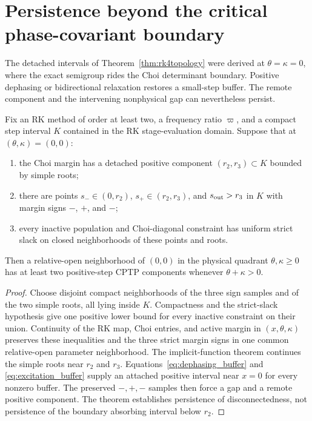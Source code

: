 \section{Persistence beyond the critical phase-covariant boundary}
\label{sec:robustness}

The detached intervals of Theorem~\ref{thm:rk4topology} were derived at $\theta=\kappa=0$, where the exact semigroup rides the Choi determinant boundary. Positive dephasing or bidirectional relaxation restores a small-step buffer. The remote component and the intervening nonphysical gap can nevertheless persist.

\begin{theorem}
\label{thm:persistence}
Fix an RK method of order at least two, a frequency ratio $\varpi$, and a compact step interval $K$ contained in the RK stage-evaluation domain. Suppose that at $(\theta,\kappa)=(0,0)$:
\begin{enumerate}
 \item the Choi margin has a detached positive component $(r_2,r_3)\subset K$ bounded by simple roots;
 \item there are points $s_-\in(0,r_2)$, $s_+\in(r_2,r_3)$, and $s_{\rm out}>r_3$ in $K$ with margin signs $-$, $+$, and $-$;
 \item every inactive population and Choi-diagonal constraint has uniform strict slack on closed neighborhoods of these points and roots.
\end{enumerate}
Then a relative-open neighborhood of $(0,0)$ in the physical quadrant $\theta,\kappa\ge0$ has at least two positive-step CPTP components whenever $\theta+\kappa>0$.
\end{theorem}

\begin{proof}
Choose disjoint compact neighborhoods of the three sign samples and of the two simple roots, all lying inside $K$. Compactness and the strict-slack hypothesis give one positive lower bound for every inactive constraint on their union. Continuity of the RK map, Choi entries, and active margin in $(x,\theta,\kappa)$ preserves these inequalities and the three strict margin signs in one common relative-open parameter neighborhood. The implicit-function theorem continues the simple roots near $r_2$ and $r_3$. Equations~\eqref{eq:dephasing_buffer} and \eqref{eq:excitation_buffer} supply an attached positive interval near $x=0$ for every nonzero buffer. The preserved $-,+,-$ samples then force a gap and a remote positive component. The theorem establishes persistence of disconnectedness, not persistence of the boundary absorbing interval below $r_2$.
\end{proof}

